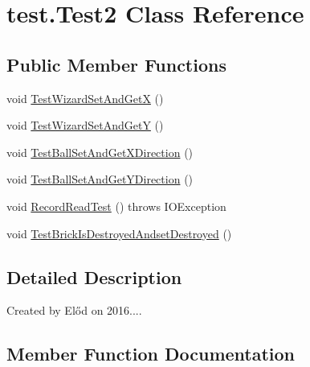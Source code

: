 \hypertarget{classtest_1_1_test2}{}\section{test.\+Test2 Class Reference}
\label{classtest_1_1_test2}
\subsection*{Public Member Functions}
\begin{DoxyCompactItemize}
\item 
void \hyperlink{classtest_1_1_test2_a7c5e762a59cf4dd38c6c7df81dcf9831}{Test\+Wizard\+Set\+And\+GetX} ()
\item 
void \hyperlink{classtest_1_1_test2_aa6bc4b81aed7d70c4670f3ec6fba0934}{Test\+Wizard\+Set\+And\+GetY} ()
\item 
void \hyperlink{classtest_1_1_test2_aea166c617674b555e0751052214498c0}{Test\+Ball\+Set\+And\+Get\+X\+Direction} ()
\item 
void \hyperlink{classtest_1_1_test2_a4f48c410ae21306ae516afdec411c878}{Test\+Ball\+Set\+And\+Get\+Y\+Direction} ()
\item 
void \hyperlink{classtest_1_1_test2_a12421d86d9961f7458de94356b09bfa4}{Record\+Read\+Test} ()  throws I\+O\+Exception 
\item 
void \hyperlink{classtest_1_1_test2_a85729314bfa16f727394157f74d252b9}{Test\+Brick\+Is\+Destroyed\+Andset\+Destroyed} ()
\end{DoxyCompactItemize}


\subsection{Detailed Description}
Created by Előd on 2016.... 

\subsection{Member Function Documentation}
